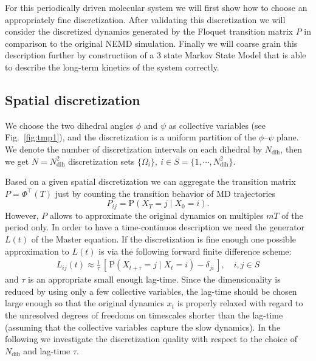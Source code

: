 \documentclass[aps, pre, preprint,unsortedaddress,a4paper,onecolumn]{revtex4}
\newcommand{\vect}[1]{#1}
\newcommand{\myphi}{\Phi}
\newcommand{\prob}{\textrm{P}}
\newcommand{\dih}{\textrm{dih}}
\begin{document}
For this periodically driven molecular system we will first show how to choose an appropriately fine discretization. After validating this discretization we will consider
the discretized dynamics generated by the Floquet transition matrix $\vect P$
in comparison to the original NEMD simulation. Finally we will coarse grain this description further by constructiion of a $3$ state Markov State Model that is able to describe the long-term kinetics of the system correctly. 

\subsection{Spatial discretization}

We choose the
two dihedral angles $\phi$ and $\psi$ as collective variables (see
Fig.~\ref{fig:tmp1}), and the discretization is a uniform partition of
the $\phi$--$\psi$ plane. We denote the number of discretization intervals on each
dihedral by $N_\dih$, then we get $N = N_\dih^2$ discretization sets 
$\{\Omega_i\},\ i\in S = \{1,\cdots,N_\dih^2\}$.

Based on a given spatial discretization we can aggregate the transition matrix $\vect P=\myphi^{\top}(T)$ just by counting the transition behavior of MD trajectories 
\begin{equation}\label{Pdirect}
\vect P_{ij}=\prob\left(\vect X_T=j\mid \vect X_0=i \right).
\end{equation}
However, $\vect P$ allows to approximate the original dynamics on multiples $mT$ of the period only. In order to have a time-continuos description we need the generator $L(t)$ of the Master equation. 
If the discretization is fine enough one possible approximation to $L(t)$ is via
the following forward finite difference scheme:
\begin{align}
  \label{eqn:tmp4}
  L_{ij}(t) \approx \frac{1}{\tau}
  \,[\, \prob (\vect X_{t+\tau} = j \mid \vect X_{t} = i) - \delta_{ji} \,],
  \quad i,j\in S
\end{align}
and $\tau$ is an appropriate small enough lag-time.
  Since the dimensionality is reduced by using only a few collective
  variables, the lag-time should be chosen large enough so that
  the original dynamics $x_t$ is properly relaxed with regard to
  the unresolved degrees of freedoms on timescales shorter than the lag-time
  (assuming  that the collective variables capture the slow dynamics).
  In the following 
we investigate the discretization
quality with respect to  the choice of $N_\dih$ and  lag-time $\tau$.
\end{document}
